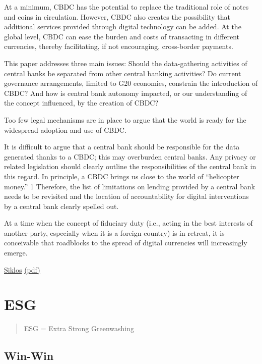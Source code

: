 \documentclass[
]{book}
\begin{document}
At a minimum,
CBDC has the potential to replace the traditional
role of notes and coins in circulation. However,
CBDC also creates the possibility that additional
services provided through digital technology
can be added. At the global level, CBDC can ease
the burden and costs of transacting in different
currencies, thereby facilitating, if not encouraging,
cross-border payments.

This paper addresses three main issues: Should
the data-gathering activities of central banks be
separated from other central banking activities?
Do current governance arrangements, limited
to G20 economies, constrain the introduction
of CBDC? And how is central bank autonomy
impacted, or our understanding of the concept
influenced, by the creation of CBDC?

Too few legal mechanisms are in place to argue that
the world is ready for the widespread adoption
and use of CBDC.

It is difficult to argue that a central bank
should be responsible for the data generated
thanks to a CBDC; this may overburden central
banks. Any privacy or related legislation should
clearly outline the responsibilities of the central
bank in this regard. In principle, a CBDC brings
us close to the world of ``helicopter money.'' 1
Therefore, the list of limitations on lending
provided by a central bank needs to be revisited
and the location of accountability for digital
interventions by a central bank clearly spelled out.

At a time when
the concept of fiduciary duty (i.e., acting in the best
interests of another party, especially when it is a
foreign country) is in retreat, it is conceivable that
roadblocks to the spread of digital currencies will
increasingly emerge.

\href{https://www.cigionline.org/publications/central-bank-digital-currency-and-governance-fit-purpose}{Siklos}
\href{pdf/Siklos_2021_Central_Bank_Digital_Currency.pdf}{(pdf)}

\hypertarget{esg}{%
\chapter{ESG}\label{esg}}

\begin{quote}
ESG = Extra Strong Greenwashing
\end{quote}

\hypertarget{win-win}{%
\section{Win-Win}\label{win-win}}
\end{document}
